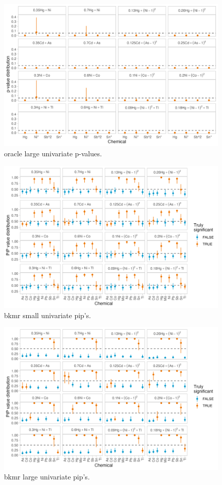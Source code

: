 \documentclass[12pt, twoside]{amherstthesis}
\begin{document}
\begin{figure}

{\centering \includegraphics[width=0.75\linewidth]{figures/ch4_olg_univ_pval} 

}

\caption{oracle large univariate p-values.}\label{fig:olgunivp}
\end{figure}
\begin{figure}

{\centering \includegraphics[width=0.75\linewidth]{figures/ch4_ksm_univ_pips} 

}

\caption{bkmr small univariate pip's.}\label{fig:ksmunivp}
\end{figure}
\begin{figure}

{\centering \includegraphics[width=0.75\linewidth]{figures/ch4_klg_univ_pips} 

}

\caption{bkmr large univariate pip's.}\label{fig:klgunivp}
\end{figure}
\end{document}
